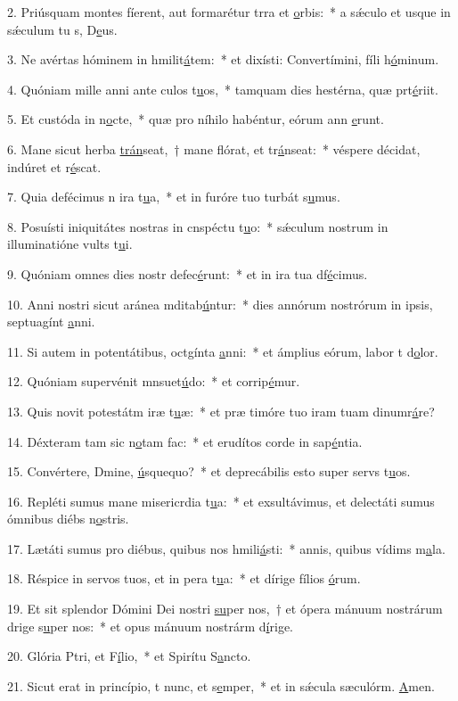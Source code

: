 2. Priúsquam montes fíerent, aut formarétur trra et \uline{o}rbis:~* a sǽculo et usque in sǽculum tu s, D\uline{e}us.\par 
3. Ne avértas hóminem in hmilit\uline{á}tem:~* et dixísti: Convertímini, fíli h\uline{ó}minum.\par 
4. Quóniam mille anni ante culos t\uline{u}os,~* tamquam dies hestérna, quæ prt\uline{é}riit.\par 
5. Et custóda in n\uline{o}cte,~* quæ pro níhilo habéntur, eórum ann \uline{e}runt.\par 
6. Mane sicut herba \uline{trán}seat,~† mane flórat, et tr\uline{á}nseat:~* véspere décidat, indúret et r\uline{é}scat.\par 
7. Quia defécimus n ira t\uline{u}a,~* et in furóre tuo turbát s\uline{u}mus.\par 
8. Posuísti iniquitátes nostras in cnspéctu t\uline{u}o:~* sǽculum nostrum in illuminatióne vults t\uline{u}i.\par 
9. Quóniam omnes dies nostr defec\uline{é}runt:~* et in ira tua df\uline{é}cimus.\par 
10. Anni nostri sicut aránea mditab\uline{ú}ntur:~* dies annórum nostrórum in ipsis, septuagínt \uline{a}nni.\par 
11. Si autem in potentátibus, octgínta \uline{a}nni:~* et ámplius eórum, labor t d\uline{o}lor.\par 
12. Quóniam supervénit mnsuet\uline{ú}do:~* et corrip\uline{é}mur.\par 
13. Quis novit potestátm iræ t\uline{u}æ:~* et præ timóre tuo iram tuam dinumr\uline{á}re?\par 
14. Déxteram tam sic n\uline{o}tam fac:~* et erudítos corde in sap\uline{é}ntia.\par 
15. Convértere, Dmine, \uline{ú}squequo?~* et deprecábilis esto super servs t\uline{u}os.\par 
16. Repléti sumus mane misericrdia t\uline{u}a:~* et exsultávimus, et delectáti sumus ómnibus diébs n\uline{o}stris.\par 
17. Lætáti sumus pro diébus, quibus nos hmili\uline{á}sti:~* annis, quibus vídims m\uline{a}la.\par 
18. Réspice in servos tuos, et in pera t\uline{u}a:~* et dírige fílios \uline{ó}rum.\par 
19. Et sit splendor Dómini Dei nostri \uline{su}per nos,~† et ópera mánuum nostrárum drige s\uline{u}per nos:~* et opus mánuum nostrárm d\uline{í}rige.\par 
20. Glória Ptri, et F\uline{í}lio,~* et Spirítu S\uline{a}ncto.\par 
21. Sicut erat in princípio, t nunc, et s\uline{e}mper,~* et in sǽcula sæculórm. \uline{A}men.\par 
